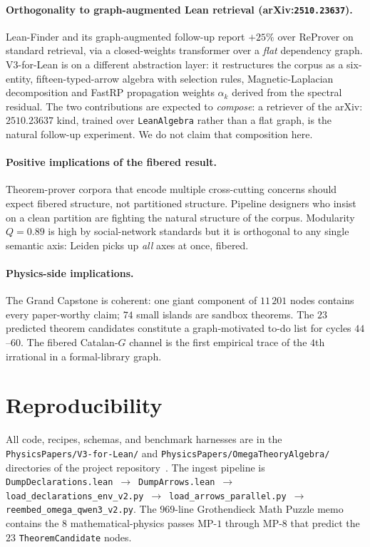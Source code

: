 \documentclass[11pt]{article}
\begin{document}
\paragraph{Orthogonality to graph-augmented Lean retrieval
(arXiv:\texttt{2510.23637}).}
Lean-Finder and its graph-augmented follow-up
\citep{leanfinder2025} report $+25\%$ over ReProver on standard
retrieval, via a closed-weights transformer over a \emph{flat}
dependency graph. V3-for-Lean is on a different abstraction layer:
it restructures the corpus as a six-entity, fifteen-typed-arrow algebra
with selection rules, Magnetic-Laplacian decomposition and FastRP
propagation weights $\alpha_k$ derived from the spectral residual. The
two contributions are expected to \emph{compose}: a retriever of the
arXiv:$2510.23637$ kind, trained over \lstinline|LeanAlgebra| rather
than a flat graph, is the natural follow-up experiment. We do not
claim that composition here.

\paragraph{Positive implications of the fibered result.}
Theorem-prover corpora that encode multiple cross-cutting concerns
should expect fibered structure, not partitioned structure. Pipeline
designers who insist on a clean partition are fighting the natural
structure of the corpus. Modularity $Q=0.89$ is high by social-network
standards but it is orthogonal to any single semantic axis: Leiden
picks up \emph{all} axes at once, fibered.

\paragraph{Physics-side implications.}
The Grand Capstone is coherent: one giant component of $11\,201$ nodes
contains every paper-worthy claim; $74$ small islands are sandbox
theorems. The $23$ predicted theorem candidates constitute a
graph-motivated to-do list for cycles $44$--$60$. The fibered
Catalan-$G$ channel is the first empirical trace of the $4$th
irrational in a formal-library graph.

\section*{Reproducibility}

All code, recipes, schemas, and benchmark harnesses are in the
\texttt{PhysicsPapers/V3-for-Lean/} and
\texttt{PhysicsPapers/OmegaTheoryAlgebra/} directories of the project
repository~\citep{marchewka2026omegatheory}. The ingest pipeline is
\lstinline|DumpDeclarations.lean|~$\to$~\lstinline|DumpArrows.lean|~$\to$~
\lstinline|load_declarations_env_v2.py|~$\to$~\lstinline|load_arrows_parallel.py|~$\to$~
\lstinline|reembed_omega_qwen3_v2.py|. The $969$-line Grothendieck Math
Puzzle memo~\citep{navi2026grothendieck} contains the $8$
mathematical-physics passes MP-$1$ through MP-$8$ that predict the
$23$ \lstinline|TheoremCandidate| nodes.
\end{document}
